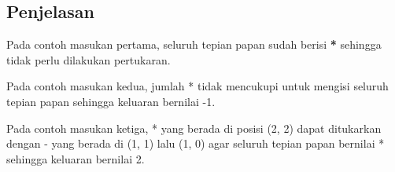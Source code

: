 \documentclass{article}
\begin{document}
\subsection*{Penjelasan}
Pada contoh masukan pertama, seluruh tepian papan sudah berisi \textbf{*} sehingga tidak perlu dilakukan pertukaran.

Pada contoh masukan kedua, jumlah * tidak mencukupi untuk mengisi seluruh tepian papan sehingga keluaran bernilai -1.

Pada contoh masukan ketiga, * yang berada di posisi (2, 2) dapat ditukarkan dengan - yang berada di (1, 1) lalu (1, 0) agar seluruh tepian papan bernilai * sehingga keluaran bernilai 2.
\end{document}
